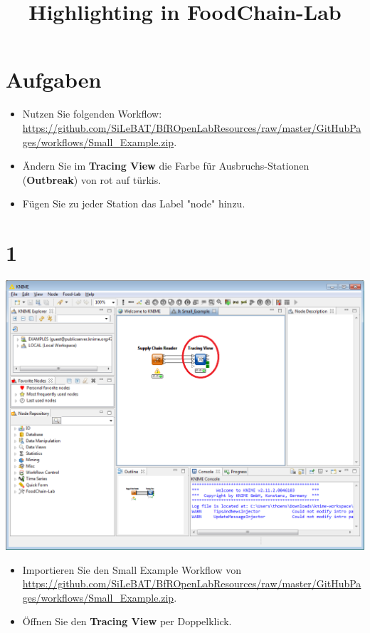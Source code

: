\documentclass{beamer}
\title{Highlighting in FoodChain-Lab}
\date{}
\begin{document}
\maketitle

\section{Aufgaben}
\begin{frame}
	\begin{itemize}
		\item Nutzen Sie folgenden Workflow: \url{https://github.com/SiLeBAT/BfROpenLabResources/raw/master/GitHubPages/workflows/Small_Example.zip}.
		\item Ändern Sie im \textbf{Tracing View} die Farbe für Ausbruchs-Stationen (\textbf{Outbreak}) von rot auf türkis.
		\item Fügen Sie zu jeder Station das Label "node" hinzu.
	\end{itemize}
\end{frame}
 
\section{1}
\begin{frame}
	\begin{center}
  		\includegraphics[height=0.6\textheight]{1.png}
	\end{center}
	\begin{itemize}
		\item Importieren Sie den Small Example Workflow von \url{https://github.com/SiLeBAT/BfROpenLabResources/raw/master/GitHubPages/workflows/Small_Example.zip}.
		\item Öffnen Sie den \textbf{Tracing View} per Doppelklick.
	\end{itemize}
\end{frame}
\end{document}
